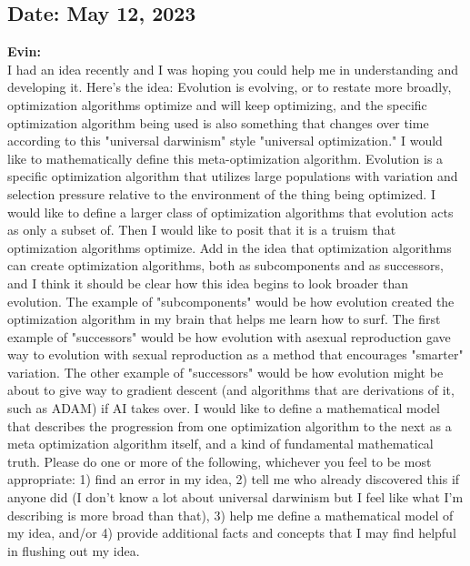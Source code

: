 \documentclass{article}[10pt]
\begin{document}
\subsection{Date: May 12, 2023}
\noindent \textbf{Evin:}\\
I had an idea recently and I was hoping you could help me in understanding and developing it. 
Here's the idea: Evolution is evolving, or to restate more broadly, optimization algorithms optimize and will keep optimizing, and the specific optimization algorithm being used is also something that changes over time according to this "universal darwinism" style "universal optimization." 
I would like to mathematically define this meta-optimization algorithm. 
Evolution is a specific optimization algorithm that utilizes large populations with variation and selection pressure relative to the environment of the thing being optimized. 
I would like to define a larger class of optimization algorithms that evolution acts as only a subset of. 
Then I would like to posit that it is a truism that optimization algorithms optimize. 
Add in the idea that optimization algorithms can create optimization algorithms, both as subcomponents and as successors, and I think it should be clear how this idea begins to look broader than evolution. 
The example of "subcomponents" would be how evolution created the optimization algorithm in my brain that helps me learn how to surf. 
The first example of "successors" would be how evolution with asexual reproduction gave way to evolution with sexual reproduction as a method that encourages "smarter" variation. 
The other example of "successors" would be how evolution might be about to give way to gradient descent (and algorithms that are derivations of it, such as ADAM) if AI takes over. 
I would like to define a mathematical model that describes the progression from one optimization algorithm to the next as a meta optimization algorithm itself, and a kind of fundamental mathematical truth. 
Please do one or more of the following, whichever you feel to be most appropriate: 1) find an error in my idea, 2) tell me who already discovered this if anyone did (I don't know a lot about universal darwinism but I feel like what I'm describing is more broad than that), 3) help me define a mathematical model of my idea, and/or 4) provide additional facts and concepts that I may find helpful in flushing out my idea.
\end{document}
